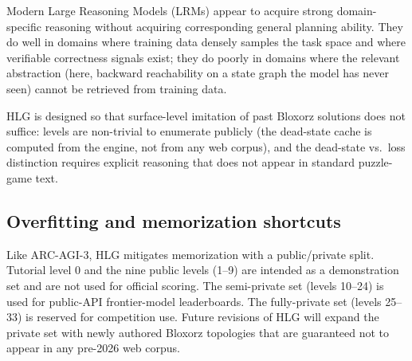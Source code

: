 Modern Large Reasoning Models (LRMs) appear to acquire strong domain-specific reasoning
without acquiring corresponding general planning ability. They do well in domains where
training data densely samples the task space and where verifiable correctness signals
exist; they do poorly in domains where the relevant abstraction (here, backward
reachability on a state graph the model has never seen) cannot be retrieved from
training data.

HLG is designed so that surface-level imitation of past Bloxorz solutions does not
suffice: levels are non-trivial to enumerate publicly (the dead-state cache is computed
from the engine, not from any web corpus), and the dead-state vs.\ loss distinction
requires explicit reasoning that does not appear in standard puzzle-game text.

\subsection{Overfitting and memorization shortcuts}
\label{sec:overfit}

Like ARC-AGI-3, HLG mitigates memorization with a public/private split. Tutorial level
0 and the nine public levels (1--9) are intended as a demonstration set and are not
used for official scoring. The semi-private set (levels 10--24) is used for
public-API frontier-model leaderboards. The fully-private set (levels 25--33) is reserved
for competition use. Future revisions of HLG will expand the private set with newly
authored Bloxorz topologies that are guaranteed not to appear in any pre-2026 web
corpus.
